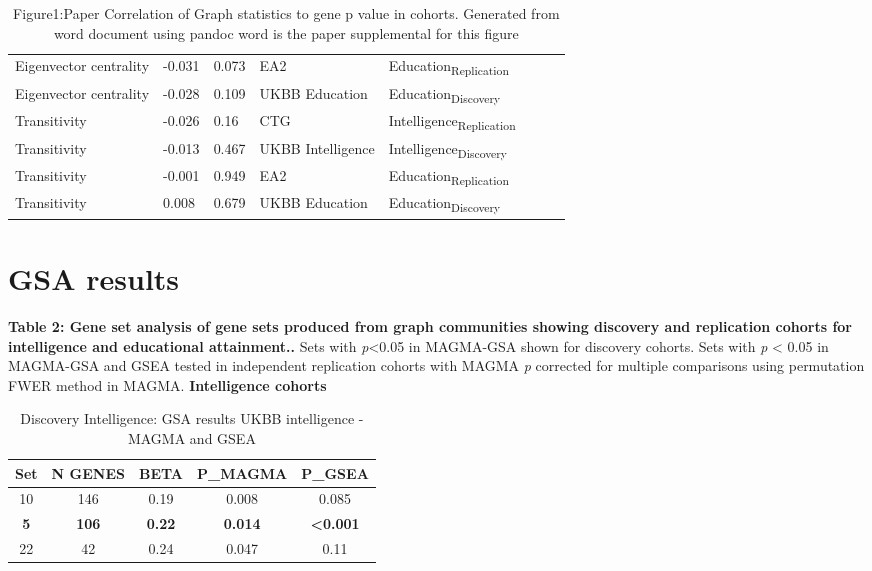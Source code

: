 \begin{table}[h]{}
\begin{tabular}{llllllll}
Eigenvector centrality & -0.031 & 0.073 & EA2 & Education\textsubscript{Replication}\\
Eigenvector centrality & -0.028 & 0.109 & UKBB Education & Education\textsubscript{Discovery}\\
Transitivity & -0.026 & 0.16 & CTG & Intelligence\textsubscript{Replication}\\
Transitivity & -0.013 & 0.467 & UKBB Intelligence & Intelligence\textsubscript{Discovery}\\
Transitivity & -0.001 & 0.949 & EA2 & Education\textsubscript{Replication}\\
Transitivity & 0.008 & 0.679 & UKBB Education & Education\textsubscript{Discovery}\\

\end{tabular}
\caption{Figure1:Paper Correlation of Graph statistics to gene p value in cohorts. Generated from word document using pandoc word is the paper supplemental for this figure}
\label{Figure:Figure1:Paper Correlation of Graph statistics to gene p value in cohorts}

\end{table}


\section{GSA results}
\textbf{Table 2: Gene set analysis of gene sets produced from graph communities showing discovery and replication cohorts for intelligence and educational attainment..} Sets with \emph{p}\textless{}0.05 in MAGMA-GSA shown for discovery cohorts. Sets with \emph{p} \textless{} 0.05 in MAGMA-GSA and GSEA tested in independent replication cohorts with MAGMA \emph{p} corrected for multiple comparisons using permutation FWER method in MAGMA.
\textbf{Intelligence cohorts}

\begin{table}[]
    \centering
    \begin{tabular}{c|c|c|c|c}
         Set & N GENES & BETA & P\_MAGMA & P\_GSEA\tabularnewline
\hline
10 & 146 & 0.19 & 0.008 & 0.085\tabularnewline
\textbf{5} & \textbf{106} & \textbf{0.22} & \textbf{0.014} & \textbf{\textless{}0.001}\tabularnewline
22 & 42 & 0.24 & 0.047 & 0.11\tabularnewline
    \end{tabular}
    \caption{Discovery Intelligence: GSA results UKBB intelligence - MAGMA and GSEA}
    \label{Table:Discovery Intelligence: GSA results UKBB intelligence - MAGMA and GSEA}
\end{table}





